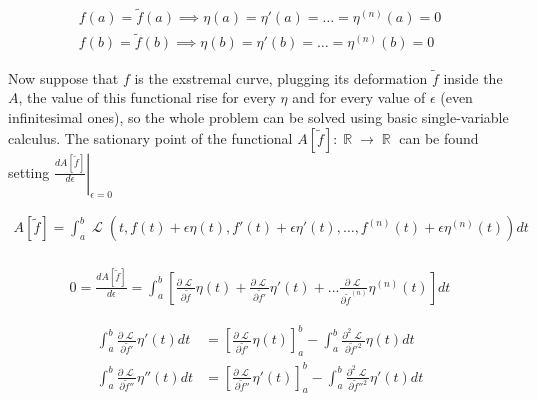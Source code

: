 \documentclass[a4paper]{article}
\DeclareMathOperator{\Lagr}{\mathcal{L}} %
\DeclareMathOperator{\R}{\mathbb{R}} %
\begin{document}
  \begin{align*}
    f(a) = \tilde{f}(a) \implies \eta(a) = \eta'(a) = \ldots = \eta^{(n)}(a) = 0 \\
    f(b) = \tilde{f}(b) \implies \eta(b) = \eta'(b) = \ldots = \eta^{(n)}(b) = 0
  \end{align*}

  Now suppose that $f$ is the exstremal curve, plugging its deformation
  $\tilde{f}$ inside the $A$, the value of this functional rise for every
  $\eta$ and for every value of $\epsilon$ (even infinitesimal ones), so the
  whole problem can be solved using basic single-variable calculus.
  The sationary point of the functional $A[\tilde{f}]: \R \rightarrow \R$
  can be found setting
  $\left. \frac{dA[\tilde{f}]}{d\epsilon} \right \rvert_{\epsilon=0}$

  \begin{align*}
    A[\tilde{f}] =
    \int_{a}^{b} \Lagr(t, f(t) + \epsilon\eta(t), f'(t) + \epsilon\eta'(t),
    \ldots, f^{(n)}(t) + \epsilon\eta^{(n)}(t)) dt \\
  \end{align*}

  \begin{align*}
    0 = \frac{dA[\tilde{f}]}{d\epsilon} = \int_{a}^{b} \left[
    \frac{\partial\Lagr}{\partial\tilde{f}}\eta(t) +
    \frac{\partial\Lagr}{\partial\tilde{f}'}\eta'(t) + \ldots
    \frac{\partial\Lagr}{\partial\tilde{f}^{(n)}}\eta^{(n)}(t) \right] dt
  \end{align*}

  \begin{align*}
    \int_{a}^{b} \frac{\partial\Lagr}{\partial\tilde{f}'}\eta'(t) dt &=
    \left[\frac{\partial\Lagr}{\partial\tilde{f}'}\eta(t)\right]^{b}_{a} -
    \int_{a}^{b} \frac{\partial^2\Lagr}{\partial\tilde{f}'^2}\eta(t) dt \\
    \int_{a}^{b} \frac{\partial\Lagr}{\partial\tilde{f}''}\eta''(t) dt &=
    \left[\frac{\partial\Lagr}{\partial\tilde{f}''}\eta'(t)\right]^{b}_{a} -
    \int_{a}^{b} \frac{\partial^2\Lagr}{\partial\tilde{f}''^2}\eta'(t) dt
  \end{align*}
\end{document}
